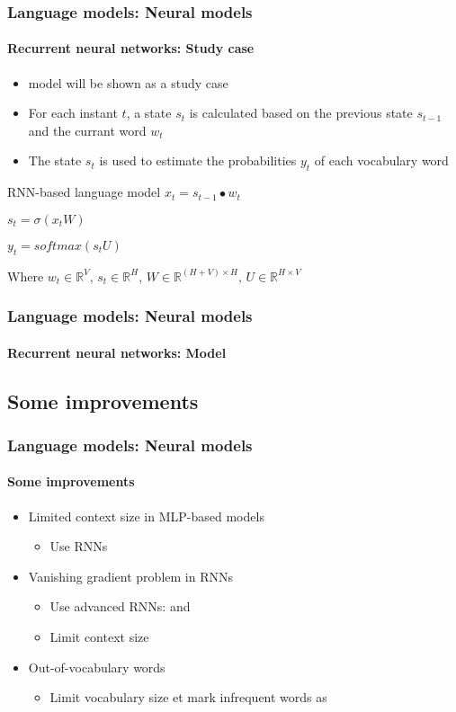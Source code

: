 \documentclass[xcolor=table]{beamer}
\begin{document}
\begin{frame}
\frametitle{Language models: Neural models}
\framesubtitle{Recurrent neural networks: Study case}

\begin{itemize}
	\item \cite{2010-mokolov-al} model will be shown as a study case
	\item For each instant $t$, a state $s_t$ is calculated based on the previous state $s_{t-1}$ and the currant word $w_t$
	\item The state $s_t$ is used to estimate the probabilities $y_t$ of each vocabulary word
\end{itemize}

\begin{block}{RNN-based language model}
	$x_t = s_{t-1} \bullet w_t$
	
	$s_t = \sigma(x_t W)$
	
	$y_t = softmax(s_t U)$
	
	Where $w_t \in \mathbb{R}^{V},\, s_t \in \mathbb{R}^{H},\, W \in \mathbb{R}^{(H+V)\times H},\, U \in \mathbb{R}^{H\times V}$
\end{block}

\end{frame}

\begin{frame}
\frametitle{Language models: Neural models}
\framesubtitle{Recurrent neural networks: Model}

\begin{center}
\end{center}

\end{frame}

\subsection{Some improvements}

\begin{frame}
\frametitle{Language models: Neural models}
\framesubtitle{Some improvements}

\begin{itemize}
	\item Limited context size in MLP-based models
	\begin{itemize}
		\item Use RNNs
	\end{itemize}
	\item Vanishing gradient problem in RNNs
	\begin{itemize}
		\item Use advanced RNNs:  and 
		\item Limit context size
	\end{itemize}
	\item Out-of-vocabulary words
	\begin{itemize}
		\item Limit vocabulary size  et mark infrequent words as 
	\end{itemize}
\end{itemize}

\end{frame}
\end{document}
